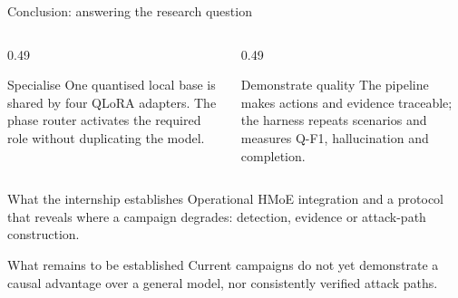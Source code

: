 \documentclass[aspectratio=169,10pt]{beamer}
\begin{document}
\begin{frame}{Conclusion: answering the research question}
  \begin{columns}[T,onlytextwidth]
    \begin{column}{0.49\textwidth}
      \begin{exampleblock}{Specialise}
        One quantised local base is shared by four QLoRA adapters. The phase
        router activates the required role without duplicating the model.
      \end{exampleblock}
    \end{column}
    \begin{column}{0.49\textwidth}
      \begin{exampleblock}{Demonstrate quality}
        The pipeline makes actions and evidence traceable; the harness repeats
        scenarios and measures Q-F1, hallucination and completion.
      \end{exampleblock}
    \end{column}
  \end{columns}

  \vspace{0.8em}
  \begin{block}{What the internship establishes}
    Operational HMoE integration and a protocol that reveals where a campaign
    degrades: detection, evidence or attack-path construction.
  \end{block}

  \begin{alertblock}{What remains to be established}
    Current campaigns do not yet demonstrate a causal advantage over a general
    model, nor consistently verified attack paths.
  \end{alertblock}
\end{frame}
\end{document}
